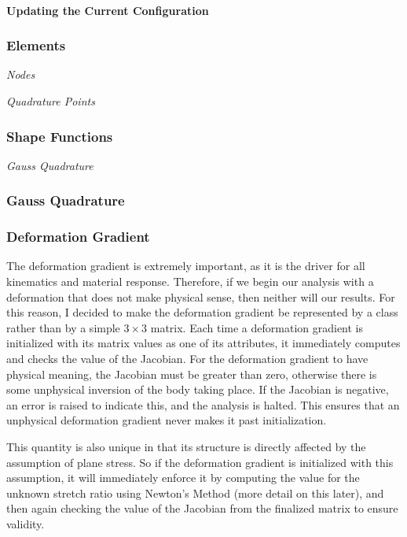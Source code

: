 \documentclass[]{spie}  %
\begin{document}
\paragraph{Updating the Current Configuration}


\subsubsection{Elements}
\textit{Nodes}

\textit{Quadrature Points}

\subsubsection{Shape Functions}
\textit{Gauss Quadrature}

\subsubsection{Gauss Quadrature}
\label{sec: gauss quadrature}

\subsubsection{Deformation Gradient}
The deformation gradient is extremely important, as it is the driver for all kinematics and material response. Therefore, if we begin our analysis with a deformation that does not make physical sense, then neither will our results. For this reason, I decided to make the deformation gradient be represented by a class rather than by a simple $3 \times 3$ matrix. Each time a deformation gradient is initialized with its matrix values as one of its attributes, it immediately computes and checks the value of the Jacobian. For the deformation gradient to have physical meaning, the Jacobian must be greater than zero, otherwise there is some unphysical inversion of the body taking place. If the Jacobian is negative, an error is raised to indicate this, and the analysis is halted. This ensures that an unphysical deformation gradient never makes it past initialization. 

This quantity is also unique in that its structure is directly affected by the assumption of plane stress. So if the deformation gradient is initialized with this assumption, it will immediately enforce it by computing the value for the unknown stretch ratio using Newton's Method (more detail on this later), and then again checking the value of the Jacobian from the finalized matrix to ensure validity.
\end{document}
